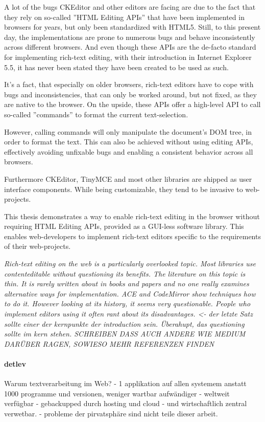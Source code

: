 A lot of the bugs CKEditor and other editors are facing are due to the fact that they rely on so-called ''HTML Editing APIs'' that have been implemented in browsers for years, but only been standardized with HTML5. Still, to this present day, the implementations are prone to numerous bugs and behave inconsistently across different browsers. And even though these APIs are the de-facto standard for implementing rich-text editing, with their introduction in Internet Explorer 5.5, it has never been stated they have been created to be used as such.

It's a fact, that especially on older browsers, rich-text editors have to cope with bugs and inconsistencies, that can only be worked around, but not fixed, as they are native to the browser. On the upside, these APIs offer a high-level API to call so-called ''commands'' to format the current text-selection. 

However, calling commands will only manipulate the document's DOM tree, in order to format the text. This can also be achieved without using editing APIs, effectively avoiding unfixable bugs and enabling a consistent behavior across all browsers.

Furthermore CKEditor, TinyMCE and most other libraries are shipped as user interface components. While being customizable, they tend to be invasive to web-projects.

This thesis demonstrates a way to enable rich-text editing in the browser without requiring HTML Editing APIs, provided as a GUI-less software library. This enables web-developers to implement rich-text editors specific to the requirements of their web-projects.

\textit{Rich-text editing on the web is a particularly overlooked topic. Most libraries use contenteditable without questioning its benefits. The literature on this topic is thin. It is rarely written about in books and papers and no one really examines alternative ways for implementation. ACE and CodeMirror show techniques how to do it. However looking at its history, it seems very questionable. People who implement editors using it often rant about its disadvantages. <- der letzte Satz sollte einer der kernpunkte der introduction sein. Überahupt, das questioning sollte im kern stehen. SCHREIBEN DASS AUCH ANDERE WIE MEDIUM DARÜBER RAGEN, SOWIESO MEHR REFERENZEN FINDEN}

\paragraph{detlev} Warum textverarbeitung im Web? - 1 applikation auf allen systemem anstatt 1000 programme und versionen, weniger wartbar aufwändiger - weltweit verfügbar - gebackupped durch hosting und cloud - und wirtschaftlich zentral verwetbar. - probleme der pirvatsphäre sind nicht teile dieser arbeit.

